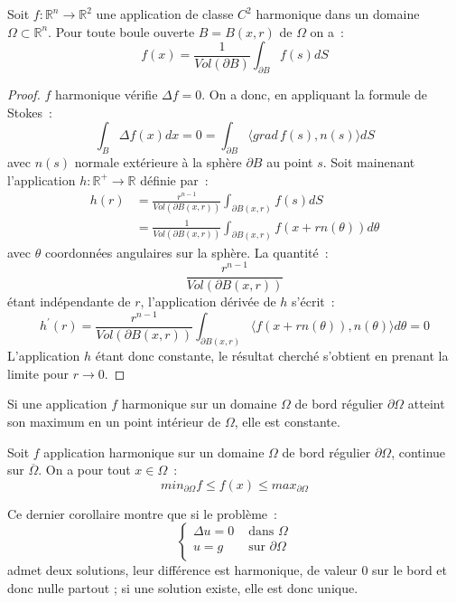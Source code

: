 \begin{theorem}
Soit $f : \mathbb{R}^n \to \mathbb{R}^2$ une application de classe
$C^2$ harmonique dans un domaine $\Omega \subset \mathbb{R}^n$. Pour
toute boule ouverte $B=B(x,r)$ de $\Omega$ on a~:
\[
f(x) = \frac{1}{Vol(\partial B)} \int_{\partial B} f(s) dS
\]
\end{theorem}
\begin{proof}
$f$ harmonique vérifie $\Delta f = 0$. On a donc, en appliquant la
formule de Stokes~:
\[
\int_B \Delta f(x) dx  = 0 = \int_{\partial B} \langle grad\, f(s), n(s)
\rangle dS
\]
avec $n(s)$ normale extérieure à la sphère $\partial B$ au point $s$.
Soit mainenant l'application $h : \mathbb{R}^+ \to \mathbb{R}$ définie
par~:
\begin{align*}
h(r) &=  \frac{r^{n-1}}{Vol(\partial B(x,r))} \int_{\partial B(x,r)} f(s)  dS
\\ &= \frac{1}{Vol(\partial B(x,r))} \int_{\partial B(x,r)} f(x+r
n(\theta))  d\theta 
\end{align*}
avec $\theta$ coordonnées angulaires sur la sphère. La quantité~:
\[
\frac{r^{n-1}}{Vol(\partial B(x,r))}
\]
étant indépendante de $r$, l'application dérivée de $h$ s'écrit~:
\[
h^\prime(r) =  \frac{r^{n-1}}{Vol(\partial B(x,r))}  \int_{\partial
  B(x,r)} \langle f(x+r n(\theta)) , n(\theta) \rangle   d\theta = 0 
\]
L'application $h$ étant donc constante, le résultat cherché s'obtient
en prenant la limite pour $r \to 0$.
\end{proof} 
\begin{corollaire}
Si une application $f$ harmonique sur un domaine $\Omega$ de bord
régulier $\partial \Omega$ atteint son
maximum en un point intérieur de $\Omega$, elle est constante.  
\end{corollaire}
\begin{corollaire}
Soit $f$ application harmonique sur un domaine $\Omega$ de bord
régulier $\partial \Omega$, continue sur $\overline{\Omega}$. 
On a pour tout $x \in \Omega$~:
\[
min_{\partial \Omega} f \leq f(x) \leq max_{\partial \Omega}
\]
\end{corollaire}

Ce dernier corollaire montre que si le problème~:
\[
\left \{
\begin{array}{cc}
\Delta u = 0 & \mbox{ dans } \Omega \\
u = g & \mbox{ sur } \partial \Omega \\
\end{array}
\right .
\] 
admet deux solutions, leur différence est harmonique, de valeur 0 sur
le bord et donc nulle partout ; si une solution existe, elle est donc
unique.


